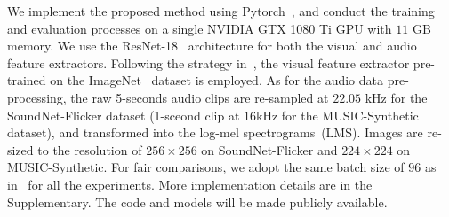  We implement the proposed method using Pytorch~\cite{pytorch}, and conduct the training and evaluation processes on a single NVIDIA GTX 1080 Ti GPU with $11$ GB memory.
%
We use the ResNet-18~\cite{resnet} architecture for both the visual and audio feature extractors.
%
Following the strategy in~\cite{av_eccv20_mms_loc,av_nips20_loc}, the visual feature extractor pre-trained on the ImageNet~\cite{ImageNet} dataset is employed.
%
As for the audio data pre-processing, the raw 5-seconds audio clips are re-sampled at $22.05$ kHz for the SoundNet-Flicker dataset (1-sceond clip at $16$kHz for the MUSIC-Synthetic dataset), and transformed into the log-mel spectrograms~(LMS).
%
%
Images are re-sized to the resolution of $256\times 256$ on SoundNet-Flicker and $224\times 224$ on MUSIC-Synthetic.
%
For fair comparisons, we adopt the same batch size of $96$ as in~\cite{av_eccv20_mms_loc,av_nips20_loc} for all the experiments. %
%
More implementation details are in the Supplementary.
%
The code and models will be made publicly available.


%


